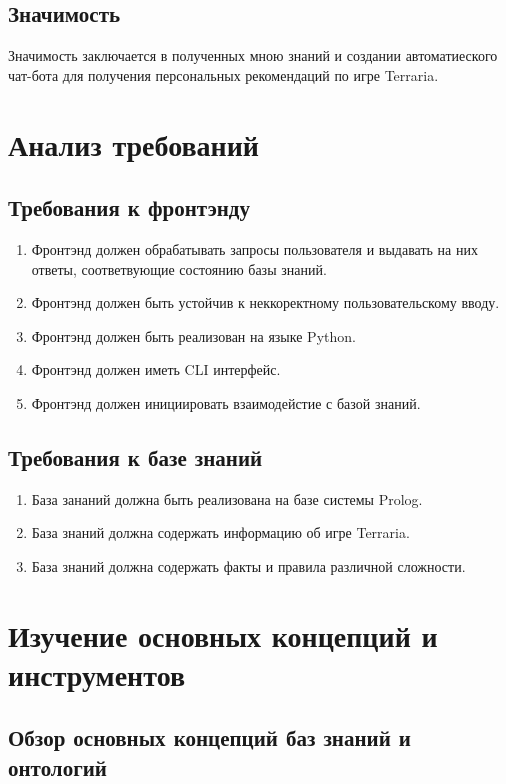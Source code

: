 \documentclass{article}
\begin{document}
\subsection{Значимость}

Значимость заключается в полученных мною знаний
и создании автоматиеского чат-бота для получения
персональных рекомендаций по игре Terraria.

\section{Анализ требований}

\subsection{Требования к фронтэнду}

\begin{enumerate}
  \item Фронтэнд должен обрабатывать запросы пользователя и выдавать
        на них ответы, соответвующие состоянию базы знаний.
  \item Фронтэнд должен быть устойчив к неккоректному
        пользовательскому вводу.
  \item Фронтэнд должен быть реализован на языке Python.
  \item Фронтэнд должен иметь CLI интерфейс.
  \item Фронтэнд должен инициировать взаимодейстие с базой знаний.
\end{enumerate}

\subsection{Требования к базе знаний}

\begin{enumerate}
  \item База зананий должна быть реализована на базе системы Prolog.
  \item База знаний должна содержать информацию об игре Terraria.
  \item База знаний должна содержать факты и правила различной сложности.
\end{enumerate}


\section{Изучение основных концепций и инструментов}

\subsection{Обзор основных концепций баз знаний и онтологий}
\end{document}

